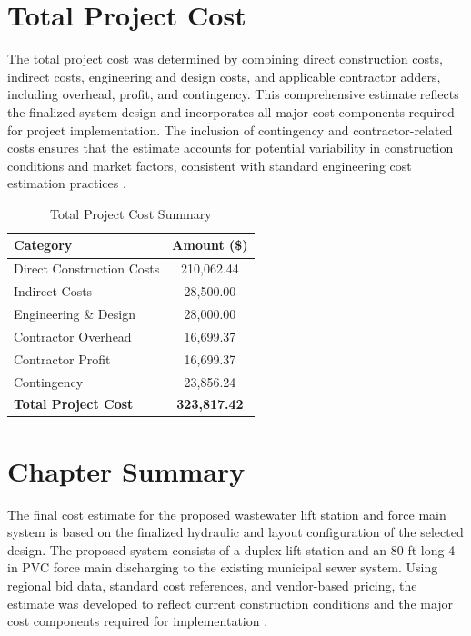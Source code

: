\section{Total Project Cost}

The total project cost was determined by combining direct construction costs, indirect costs, engineering and design costs, and applicable contractor adders, including overhead, profit, and contingency. This comprehensive estimate reflects the finalized system design and incorporates all major cost components required for project implementation. The inclusion of contingency and contractor-related costs ensures that the estimate accounts for potential variability in construction conditions and market factors, consistent with standard engineering cost estimation practices \cite{FHWA_MajorProjectCostGuidance_2007}.

\begin{table}[H]
\centering
\caption{Total Project Cost Summary}
\label{tab:total_cost}
\begin{tabular}{l c}
\toprule
\textbf{Category} & \textbf{Amount (\$)} \\
\midrule
Direct Construction Costs & 210,062.44 \\
Indirect Costs            & 28,500.00  \\
Engineering \& Design     & 28,000.00  \\
Contractor Overhead       & 16,699.37  \\
Contractor Profit         & 16,699.37  \\
Contingency               & 23,856.24  \\
\midrule
\textbf{Total Project Cost} & \textbf{323,817.42} \\
\bottomrule
\end{tabular}
\end{table}


\section{Chapter Summary}

The final cost estimate for the proposed wastewater lift station and force main system is based on the finalized hydraulic and layout configuration of the selected design. The proposed system consists of a duplex lift station and an 80-ft-long 4-in PVC force main discharging to the existing municipal sewer system. Using regional bid data, standard cost references, and vendor-based pricing, the estimate was developed to reflect current construction conditions and the major cost components required for implementation \cite{MDOT_BidTab_2024, CityMagnolia_BidTab_2024, CityClinton_BidTab_2020, RSMeans_CostData_2025, FHWA_MajorProjectCostGuidance_2007, Shifat_CostEstimate_2026}.

